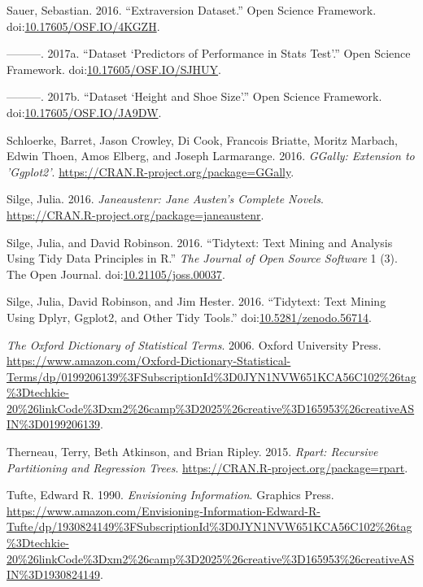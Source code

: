 \documentclass[12pt,]{book}
\begin{document}
\hypertarget{ref-Sauer_2016}{}
Sauer, Sebastian. 2016. ``Extraversion Dataset.'' Open Science
Framework.
doi:\href{https://doi.org/10.17605/OSF.IO/4KGZH}{10.17605/OSF.IO/4KGZH}.

\hypertarget{ref-Sauer_2017}{}
---------. 2017a. ``Dataset `Predictors of Performance in Stats Test'.''
Open Science Framework.
doi:\href{https://doi.org/10.17605/OSF.IO/SJHUY}{10.17605/OSF.IO/SJHUY}.

\hypertarget{ref-Sauer_2017a}{}
---------. 2017b. ``Dataset `Height and Shoe Size'.'' Open Science
Framework.
doi:\href{https://doi.org/10.17605/OSF.IO/JA9DW}{10.17605/OSF.IO/JA9DW}.

\hypertarget{ref-R-GGally}{}
Schloerke, Barret, Jason Crowley, Di Cook, Francois Briatte, Moritz
Marbach, Edwin Thoen, Amos Elberg, and Joseph Larmarange. 2016.
\emph{GGally: Extension to 'Ggplot2'}.
\url{https://CRAN.R-project.org/package=GGally}.

\hypertarget{ref-R-janeaustenr}{}
Silge, Julia. 2016. \emph{Janeaustenr: Jane Austen's Complete Novels}.
\url{https://CRAN.R-project.org/package=janeaustenr}.

\hypertarget{ref-Silge2016}{}
Silge, Julia, and David Robinson. 2016. ``Tidytext: Text Mining and
Analysis Using Tidy Data Principles in R.'' \emph{The Journal of Open
Source Software} 1 (3). The Open Journal.
doi:\href{https://doi.org/10.21105/joss.00037}{10.21105/joss.00037}.

\hypertarget{ref-tidytext-archive}{}
Silge, Julia, David Robinson, and Jim Hester. 2016. ``Tidytext: Text
Mining Using Dplyr, Ggplot2, and Other Tidy Tools.''
doi:\href{https://doi.org/10.5281/zenodo.56714}{10.5281/zenodo.56714}.

\hypertarget{ref-oxford}{}
\emph{The Oxford Dictionary of Statistical Terms}. 2006. Oxford
University Press.
\url{https://www.amazon.com/Oxford-Dictionary-Statistical-Terms/dp/0199206139\%3FSubscriptionId\%3D0JYN1NVW651KCA56C102\%26tag\%3Dtechkie-20\%26linkCode\%3Dxm2\%26camp\%3D2025\%26creative\%3D165953\%26creativeASIN\%3D0199206139}.

\hypertarget{ref-R-rpart}{}
Therneau, Terry, Beth Atkinson, and Brian Ripley. 2015. \emph{Rpart:
Recursive Partitioning and Regression Trees}.
\url{https://CRAN.R-project.org/package=rpart}.

\hypertarget{ref-1930824149}{}
Tufte, Edward R. 1990. \emph{Envisioning Information}. Graphics Press.
\url{https://www.amazon.com/Envisioning-Information-Edward-R-Tufte/dp/1930824149\%3FSubscriptionId\%3D0JYN1NVW651KCA56C102\%26tag\%3Dtechkie-20\%26linkCode\%3Dxm2\%26camp\%3D2025\%26creative\%3D165953\%26creativeASIN\%3D1930824149}.
\end{document}
